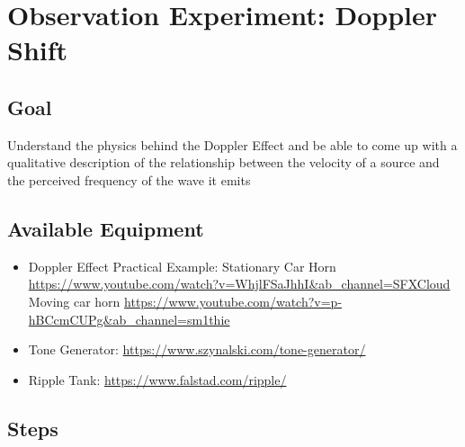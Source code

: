 \section{Observation Experiment: Doppler Shift}

\subsection{Goal}
Understand the physics behind the Doppler Effect and be able to come up with a qualitative description of the relationship between the velocity of a source and the perceived frequency of the wave it emits

\subsection{Available Equipment}
\begin{itemize}
	\item Doppler Effect Practical Example: Stationary Car Horn \url{https://www.youtube.com/watch?v=WhjlFSaJhhI&ab_channel=SFXCloud}
	Moving car horn \url{https://www.youtube.com/watch?v=p-hBCcmCUPg&ab_channel=sm1thie}
	\item Tone Generator: \url{https://www.szynalski.com/tone-generator/}
	\item Ripple Tank: \url{https://www.falstad.com/ripple/}
\end{itemize}

\subsection{Steps}

